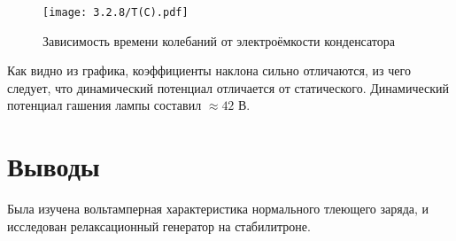\documentclass[a4paper,12pt]{article} %
\begin{document}
\begin{figure}
    \centering
    \texttt{[image: 3.2.8/T(C).pdf]}
    \caption{Зависимость времени колебаний от электроёмкости конденсатора}
    \label{tc}
\end{figure}


Как видно из графика, коэффициенты наклона сильно отличаются, из чего следует, что динамический потенциал отличается от статического. Динамический потенциал гашения лампы составил $\approx 42$ В.

\section{Выводы}

Была изучена вольтамперная характеристика нормального тлеющего заряда, и исследован релаксационный генератор на стабилитроне.
\end{document}
